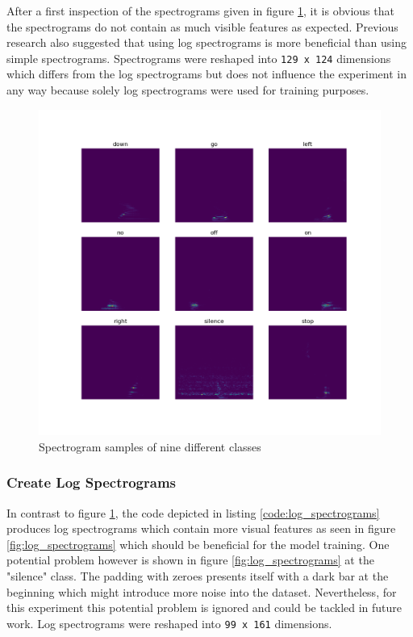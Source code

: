 \documentclass{article}
\theoremstyle{definition}
\theoremstyle{remark}
\begin{document}
After a first inspection of the spectrograms given in figure \ref{fig:spectrograms}, it is obvious that the spectrograms do not contain as much visible features as expected. Previous research \cite{gouda2018speech} also suggested that using log spectrograms is more beneficial than using simple spectrograms. Spectrograms were reshaped into \texttt{129 x 124} dimensions which differs from the log spectrograms but does not influence the experiment in any way because solely log spectrograms were used for training purposes.


\begin{figure}[h!]
    \centering
    \includegraphics[width=1\textwidth]{img/9_spectrograms.png}
    \caption{Spectrogram samples of nine different classes}
    \label{fig:spectrograms}
\end{figure}

\newpage

\subsubsection{Create Log Spectrograms}

In contrast to figure \ref{fig:spectrograms}, the code depicted in listing \ref{code:log_spectrograms} produces log spectrograms which contain more visual features as seen in figure \ref{fig:log_spectrograms} which should be beneficial for the model training. One potential problem however is shown in figure \ref{fig:log_spectrograms} at the "silence" class. The padding with zeroes presents itself with a dark bar at the beginning which might introduce more noise into the dataset. Nevertheless, for this experiment this potential problem is ignored and could be tackled in future work. Log spectrograms were reshaped into \texttt{99 x 161} dimensions.
\end{document}

